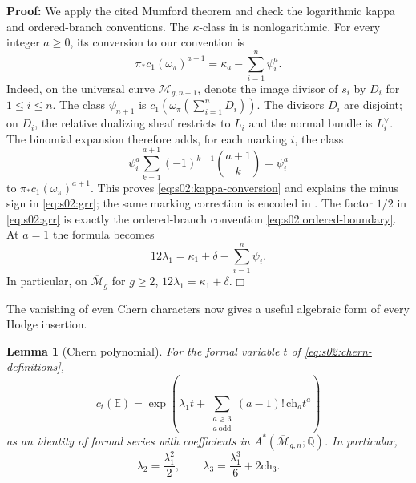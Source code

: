 \documentclass[a4paper,10pt]{article}
\numberwithin{equation}{section}
\newcommand{\MM}{\overline{\mathcal{M}}}
\newcommand{\EE}{\mathbb{E}}
\theoremstyle{paperplain}
\newtheorem{lmm}[thm]{Lemma}
\theoremstyle{paperremark}
\theoremstyle{paperplain}
\newenvironment{prf}{\noindent \textbf{Proof: }}{\hfill $\mdlgwhtsquare$\par\addvspace{0.5\baselineskip}}
\begin{document}
\begin{prf}
We apply the cited Mumford theorem and check the logarithmic
kappa and ordered-branch conventions. The $\kappa$-class in
\cite{FP00} is nonlogarithmic.  For every integer $a\geq0$, its
conversion to our convention is
\begin{equation}
\label{eq:s02:kappa-conversion}
\pi_*c_1(\omega_\pi)^{a+1}
=\kappa_a-\sum_{i=1}^n\psi_i^a.
\end{equation}
Indeed, on the universal curve $\MM_{g,n+1}$, denote the image
divisor of $s_i$ by $D_i$ for $1\leq i\leq n$.
The class $\psi_{n+1}$ is
$c_1(\omega_\pi(\sum_{i=1}^nD_i))$.  The divisors $D_i$ are
disjoint; on $D_i$, the relative dualizing sheaf restricts to $L_i$
and the normal bundle is $L_i^\vee$.  The binomial expansion therefore
adds, for each marking $i$, the class
\[
\psi_i^a\sum_{k=1}^{a+1}(-1)^{k-1}\binom{a+1}{k}
=\psi_i^a
\]
to $\pi_*c_1(\omega_\pi)^{a+1}$.  This proves
\eqref{eq:s02:kappa-conversion} and explains the minus sign in
\eqref{eq:s02:grr}; the same marking correction is encoded in
\cite[\S 1.3, (16)]{FP00}.  The factor $1/2$ in
\eqref{eq:s02:grr} is exactly the ordered-branch convention
\eqref{eq:s02:ordered-boundary}.  At $a=1$ the formula becomes
\begin{equation}
\label{eq:s02:lambda-one-grr}
12\lambda_1=\kappa_1+\delta-\sum_{i=1}^n\psi_i.
\end{equation}
In particular, on $\MM_g$ for $g\geq2$,
$12\lambda_1=\kappa_1+\delta$.
\end{prf}

The vanishing of even Chern characters now gives a useful algebraic
form of every Hodge insertion.

\begin{lmm}[Chern polynomial]
\label{lmm:s02:chern-exponential}
For the formal variable $t$ of \eqref{eq:s02:chern-definitions},
\begin{equation}
\label{eq:s02:chern-exponential}
c_t(\EE)=\exp\left(
\lambda_1t+
\sum_{\substack{a\geq3\\a\ \mathrm{odd}}}
(a-1)!\,\mathrm{ch}_a t^a\right)
\end{equation}
as an identity of formal series with coefficients in
$A^*(\MM_{g,n};\mathbb Q)$.  In particular,
\begin{equation}
\label{eq:s02:lambda-two-three}
\lambda_2=\frac{\lambda_1^2}{2},
\qquad
\lambda_3=\frac{\lambda_1^3}{6}+2\mathrm{ch}_3.
\end{equation}
\end{lmm}
\end{document}

